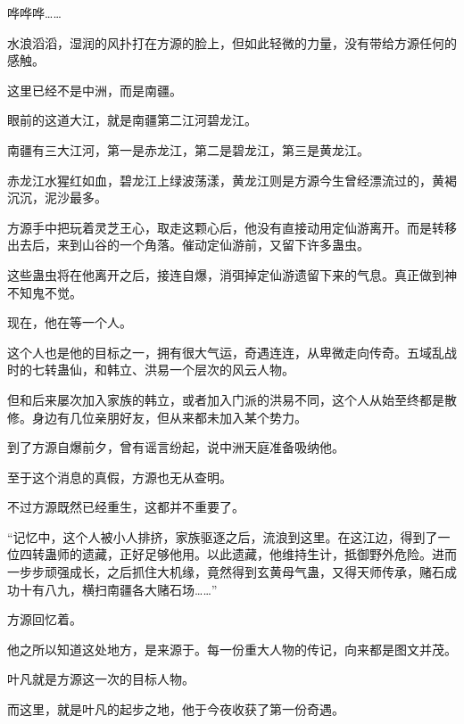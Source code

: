 \begin{this_body}
哗哗哗……

水浪滔滔，湿润的风扑打在方源的脸上，但如此轻微的力量，没有带给方源任何的感触。

这里已经不是中洲，而是南疆。

眼前的这道大江，就是南疆第二江河碧龙江。

南疆有三大江河，第一是赤龙江，第二是碧龙江，第三是黄龙江。

赤龙江水猩红如血，碧龙江上绿波荡漾，黄龙江则是方源今生曾经漂流过的，黄褐沉沉，泥沙最多。

方源手中把玩着灵芝王心，取走这颗心后，他没有直接动用定仙游离开。而是转移出去后，来到山谷的一个角落。催动定仙游前，又留下许多蛊虫。

这些蛊虫将在他离开之后，接连自爆，消弭掉定仙游遗留下来的气息。真正做到神不知鬼不觉。

现在，他在等一个人。

这个人也是他的目标之一，拥有很大气运，奇遇连连，从卑微走向传奇。五域乱战时的七转蛊仙，和韩立、洪易一个层次的风云人物。

但和后来屡次加入家族的韩立，或者加入门派的洪易不同，这个人从始至终都是散修。身边有几位亲朋好友，但从来都未加入某个势力。

到了方源自爆前夕，曾有谣言纷起，说中洲天庭准备吸纳他。

至于这个消息的真假，方源也无从查明。

不过方源既然已经重生，这都并不重要了。

“记忆中，这个人被小人排挤，家族驱逐之后，流浪到这里。在这江边，得到了一位四转蛊师的遗藏，正好足够他用。以此遗藏，他维持生计，抵御野外危险。进而一步步顽强成长，之后抓住大机缘，竟然得到玄黄母气蛊，又得天师传承，赌石成功十有八九，横扫南疆各大赌石场……”

方源回忆着。

他之所以知道这处地方，是来源于。每一份重大人物的传记，向来都是图文并茂。

叶凡就是方源这一次的目标人物。

而这里，就是叶凡的起步之地，他于今夜收获了第一份奇遇。

\end{this_body}


